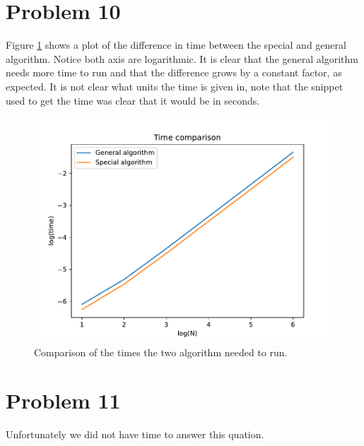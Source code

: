 \documentclass[english,notitlepage]{revtex4-1}  %
\begin{document}
\section*{Problem 10}
    Figure \ref{time} shows a plot of the difference in time between the special and general algorithm.
    Notice both axis are logarithmic.
    It is clear that the general algorithm needs more time to run and that the difference grows by a constant factor, as expected.
    It is not clear what units the time is given in, note that the snippet used to get the time was clear that it would be in seconds.
    \begin{figure}[!ht]
        \centering
        \includegraphics[scale=0.7]{time_comparison.pdf}
        \caption{Comparison of the times the two algorithm needed to run.}
        \label{time}
    \end{figure}



\section*{Problem 11}
    Unfortunately we did not have time to answer this quation.



   
\end{document}
